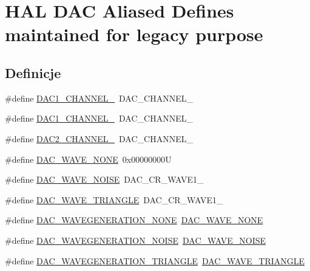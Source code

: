 \hypertarget{group___h_a_l___d_a_c___aliased___defines}{}\section{H\+AL D\+AC Aliased Defines maintained for legacy purpose}
\label{group___h_a_l___d_a_c___aliased___defines}
\subsection*{Definicje}
\begin{DoxyCompactItemize}
\item 
\#define \hyperlink{group___h_a_l___d_a_c___aliased___defines_gacd0eabd250f1026912b0e3f7deecb2e7}{D\+A\+C1\+\_\+\+C\+H\+A\+N\+N\+E\+L\+\_}~D\+A\+C\+\_\+\+C\+H\+A\+N\+N\+E\+L\+\_
\item 
\#define \hyperlink{group___h_a_l___d_a_c___aliased___defines_ga6358f0c4cfc9a0e67a739bf6cf17870c}{D\+A\+C1\+\_\+\+C\+H\+A\+N\+N\+E\+L\+\_}~D\+A\+C\+\_\+\+C\+H\+A\+N\+N\+E\+L\+\_
\item 
\#define \hyperlink{group___h_a_l___d_a_c___aliased___defines_ga8d40044bd0865cdb12fea604852f2582}{D\+A\+C2\+\_\+\+C\+H\+A\+N\+N\+E\+L\+\_}~D\+A\+C\+\_\+\+C\+H\+A\+N\+N\+E\+L\+\_
\item 
\#define \hyperlink{group___h_a_l___d_a_c___aliased___defines_ga7e80010819867e162e936510093a4cef}{D\+A\+C\+\_\+\+W\+A\+V\+E\+\_\+\+N\+O\+NE}~0x00000000U
\item 
\#define \hyperlink{group___h_a_l___d_a_c___aliased___defines_ga4585a41ff6dfd14971119283f1d8045b}{D\+A\+C\+\_\+\+W\+A\+V\+E\+\_\+\+N\+O\+I\+SE}~D\+A\+C\+\_\+\+C\+R\+\_\+\+W\+A\+V\+E1\+\_
\item 
\#define \hyperlink{group___h_a_l___d_a_c___aliased___defines_ga8340be3743135476cb33a7daf7e6ace5}{D\+A\+C\+\_\+\+W\+A\+V\+E\+\_\+\+T\+R\+I\+A\+N\+G\+LE}~D\+A\+C\+\_\+\+C\+R\+\_\+\+W\+A\+V\+E1\+\_
\item 
\#define \hyperlink{group___h_a_l___d_a_c___aliased___defines_ga646bbf1bac854ad6c65dcd932dd97057}{D\+A\+C\+\_\+\+W\+A\+V\+E\+G\+E\+N\+E\+R\+A\+T\+I\+O\+N\+\_\+\+N\+O\+NE}~\hyperlink{group___h_a_l___d_a_c___aliased___defines_ga7e80010819867e162e936510093a4cef}{D\+A\+C\+\_\+\+W\+A\+V\+E\+\_\+\+N\+O\+NE}
\item 
\#define \hyperlink{group___h_a_l___d_a_c___aliased___defines_ga983df0b8c271df50b8d230f9cd79b28e}{D\+A\+C\+\_\+\+W\+A\+V\+E\+G\+E\+N\+E\+R\+A\+T\+I\+O\+N\+\_\+\+N\+O\+I\+SE}~\hyperlink{group___h_a_l___d_a_c___aliased___defines_ga4585a41ff6dfd14971119283f1d8045b}{D\+A\+C\+\_\+\+W\+A\+V\+E\+\_\+\+N\+O\+I\+SE}
\item 
\#define \hyperlink{group___h_a_l___d_a_c___aliased___defines_ga157dcc41215ec9a313621a1b3e5ba1ab}{D\+A\+C\+\_\+\+W\+A\+V\+E\+G\+E\+N\+E\+R\+A\+T\+I\+O\+N\+\_\+\+T\+R\+I\+A\+N\+G\+LE}~\hyperlink{group___h_a_l___d_a_c___aliased___defines_ga8340be3743135476cb33a7daf7e6ace5}{D\+A\+C\+\_\+\+W\+A\+V\+E\+\_\+\+T\+R\+I\+A\+N\+G\+LE}
\end{DoxyCompactItemize}


